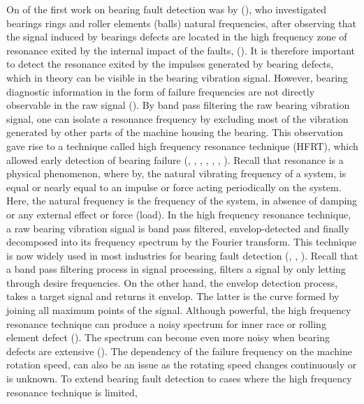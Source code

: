 \documentclass[../Main/thesis.tex]{subfiles}
\begin{document}
\justify
On of the first work on bearing fault detection was by (\cite{balderston1969}), who investigated bearings rings and roller elements (balls) natural frequencies, after observing that the signal induced by bearings defects are located in the high frequency zone of resonance exited by the internal impact of the faults, (\cite{randal2010}). It is therefore important to detect the resonance exited by the impulses generated by bearing defects, which in theory can be visible in the bearing vibration signal. However, bearing diagnostic information in the form of failure frequencies are not directly observable in the raw signal (\cite{randal2010}). By band pass filtering the raw bearing vibration signal, one can isolate a resonance frequency by excluding most of the vibration generated by other parts of the machine housing the bearing. This observation gave rise to a technique called high frequency resonance technique (HFRT), which allowed early detection of bearing failure (\cite{broderick1972}, \cite{burchill1973}, \cite{burchill1973b}, \cite{darlow1975}, \cite{darlow1975}, \cite{darlow1975b}, \cite{board1975}). Recall that resonance is a physical phenomenon, where by, the natural vibrating frequency of a system, is equal or nearly equal to an impulse or force acting periodically on the system. Here, the natural frequency is the frequency of the system, in absence of damping or any external effect or force (load).
\justify
In the high frequency resonance technique, a raw bearing vibration signal is  band pass filtered, envelop-detected and finally decomposed into its frequency spectrum by the Fourier transform. This technique is now widely used in most industries for bearing fault detection (\cite{gupta2016}, \cite{khadersab2018}, \cite{randal2010}). Recall that a band pass filtering process in signal processing, filters a signal by only letting through desire frequencies. On the other hand, the envelop detection process, takes a target signal and returns it envelop. The latter is the curve formed by joining all maximum points of the signal.
\justify
 Although powerful, the high frequency resonance technique can produce a noisy spectrum for inner race or rolling element defect (\cite{mcfadden1984}). The spectrum can become even more noisy when bearing defects are extensive (\cite{mcfadden1984}). The dependency of the failure frequency on the machine rotation speed, can also be an issue as the rotating speed changes continuously or is unknown. 
\justify
 To extend bearing fault detection to cases where the high frequency resonance technique is limited,
\end{document}
